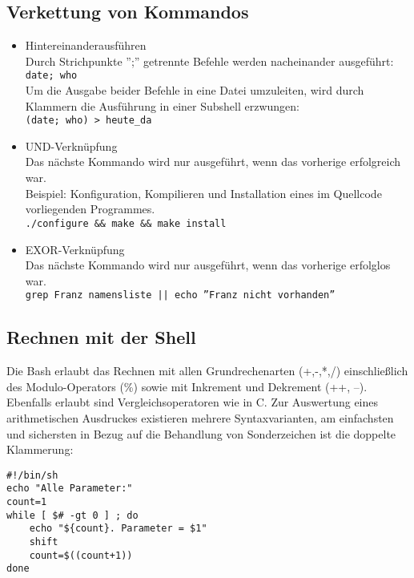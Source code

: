 \documentclass[11pt]{article}
\begin{document}
\subsection{Verkettung von Kommandos}
\begin{itemize}
\item{Hintereinanderausführen}\\
Durch Strichpunkte '';'' getrennte Befehle werden nacheinander
ausgeführt:\\
\texttt{date; who}\\
Um die Ausgabe beider Befehle in eine Datei umzuleiten, wird durch
Klammern die Ausführung in einer Subshell erzwungen:\\ 
\texttt{(date; who) >  heute\_da}\\

\item{UND-Verknüpfung}\\
Das nächste Kommando wird nur ausgeführt, wenn das vorherige erfolgreich war.\\
Beispiel: Konfiguration, Kompilieren und Installation eines im Quellcode 
vorliegenden Programmes.\\
\texttt{./configure \&\& make \&\& make install}\\

\item{EXOR-Verknüpfung}\\
Das nächste Kommando wird nur ausgeführt, wenn das vorherige erfolglos war.\\
\texttt{grep Franz namensliste  || echo ''Franz nicht vorhanden''}\\
\end{itemize}

\subsection{Rechnen mit der Shell}
Die Bash erlaubt das Rechnen mit allen Grundrechenarten (+,-,*,/)
einschließlich des Modulo-Operators (\%) sowie mit Inkrement und 
Dekrement (++, --). Ebenfalls erlaubt sind Vergleichsoperatoren wie in C. Zur
Auswertung eines arithmetischen Ausdruckes existieren mehrere
Syntaxvarianten, am einfachsten und sichersten in Bezug auf die 
Behandlung von Sonderzeichen ist die doppelte Klammerung:

\begin{verbatim}
#!/bin/sh
echo "Alle Parameter:"
count=1
while [ $# -gt 0 ] ; do
	echo "${count}. Parameter = $1"
	shift
	count=$((count+1))
done
\end{verbatim}
\end{document}

